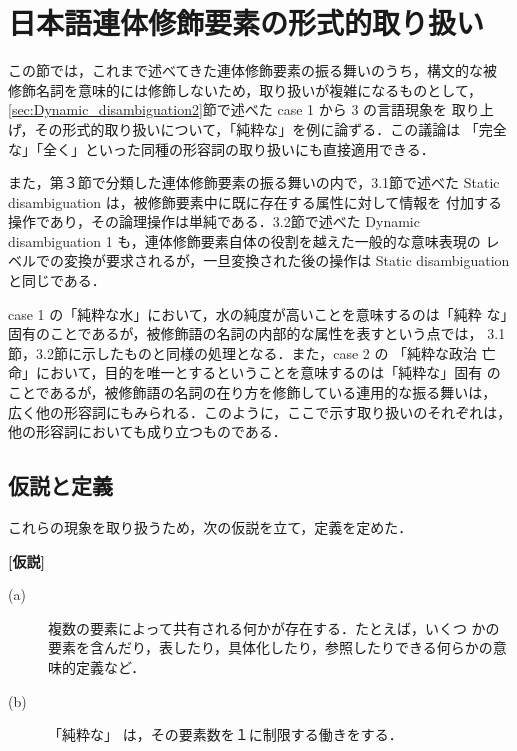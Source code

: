 \section{日本語連体修飾要素の形式的取り扱い}

この節では，これまで述べてきた連体修飾要素の振る舞いのうち，構文的な被
修飾名詞を意味的には修飾しないため，取り扱いが複雑になるものとして，
\ref{sec:Dynamic_disambiguation2}節で述べた case 1 から 3 の言語現象を
取り上げ，その形式的取り扱いについて，「純粋な」を例に論ずる．この議論は
「完全な」「全く」といった同種の形容詞の取り扱いにも直接適用できる．

また，第３節で分類した連体修飾要素の振る舞いの内で，3.1節で述べた 
Static disambiguation は，被修飾要素中に既に存在する属性に対して情報を
付加する操作であり，その論理操作は単純である．3.2節で述べた Dynamic 
disambiguation 1 も，連体修飾要素自体の役割を越えた一般的な意味表現の
レベルでの変換が要求されるが，一旦変換された後の操作は Static
disambiguation と同じである． 

case 1 の「純粋な水」において，水の純度が高いことを意味するのは「純粋
な」固有のことであるが，被修飾語の名詞の内部的な属性を表すという点では，
3.1節，3.2節に示したものと同様の処理となる．また，case 2 の
「純粋な政治 
亡命」において，目的を唯一とするということを意味するのは「純粋な」固有
のことであるが，被修飾語の名詞の在り方を修飾している連用的な振る舞いは，
広く他の形容詞にもみられる．このように，ここで示す取り扱いのそれぞれは，
他の形容詞においても成り立つものである．

\subsection{仮説と定義}
\label{sec:Hypothesis_and_Difinition}

これらの現象を取り扱うため，次の仮説を立て，定義を定めた．

\begin{flushleft}
{\bf [仮説]}
\end{flushleft}

\begin{description}

\item[(a)] 複数の要素によって共有される何かが存在する．たとえば，いくつ
  かの要素を含んだり，表したり，具体化したり，参照したりできる何らかの意
  味的定義など．

\item[(b)] 「純粋な」 は，その要素数を１に制限する働きをする．

\end{description}

